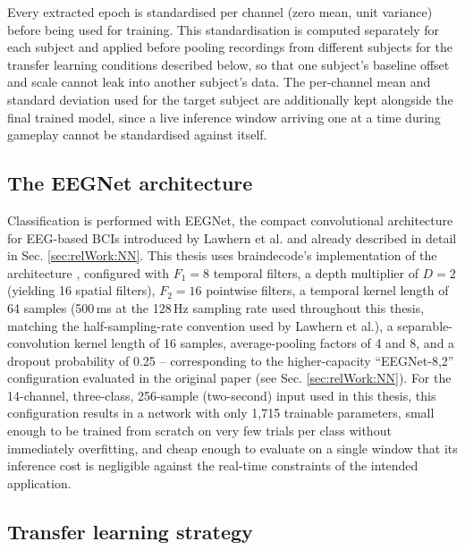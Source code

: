 Every extracted epoch is standardised per channel (zero mean, unit variance) before being used for training. This standardisation is computed separately for each subject and applied before pooling recordings from different subjects for the transfer learning conditions described below, so that one subject's baseline offset and scale cannot leak into another subject's data. The per-channel mean and standard deviation used for the target subject are additionally kept alongside the final trained model, since a live inference window arriving one at a time during gameplay cannot be standardised against itself.

\subsection{The EEGNet architecture}
\label{sec:approach:eegnet}

Classification is performed with EEGNet, the compact convolutional architecture for EEG-based BCIs introduced by Lawhern et al. and already described in detail in Sec. \ref{sec:relWork:NN}. This thesis uses braindecode's implementation of the architecture \cite{schirrmeister-2017, lawhern-2018}, configured with $F_1=8$ temporal filters, a depth multiplier of $D=2$ (yielding 16 spatial filters), $F_2=16$ pointwise filters, a temporal kernel length of 64 samples (500\,ms at the 128\,Hz sampling rate used throughout this thesis, matching the half-sampling-rate convention used by Lawhern et al.), a separable-convolution kernel length of 16 samples, average-pooling factors of 4 and 8, and a dropout probability of 0.25 -- corresponding to the higher-capacity ``EEGNet-8,2'' configuration evaluated in the original paper (see Sec. \ref{sec:relWork:NN}). For the 14-channel, three-class, 256-sample (two-second) input used in this thesis, this configuration results in a network with only 1,715 trainable parameters, small enough to be trained from scratch on very few trials per class without immediately overfitting, and cheap enough to evaluate on a single window that its inference cost is negligible against the real-time constraints of the intended application.

\subsection{Transfer learning strategy}
\label{sec:approach:transfer}

